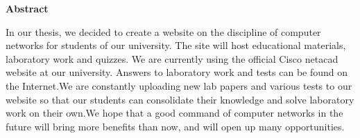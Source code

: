 \newpage
\pagestyle{plain}

\begin{center}
    \Large
    \textbf{Abstract}
\end{center}

In our thesis, we decided to create a website on the discipline of computer networks for students of our university. The site will host educational materials, laboratory work and quizzes. We are currently using the official Cisco netacad website at our university. Answers to laboratory work and tests can be found on the Internet.We are constantly uploading new lab papers and various tests to our website so that our students can consolidate their knowledge and solve laboratory work on their own.We hope that a good command of computer networks in the future will bring more benefits than now, and will open up many opportunities.
